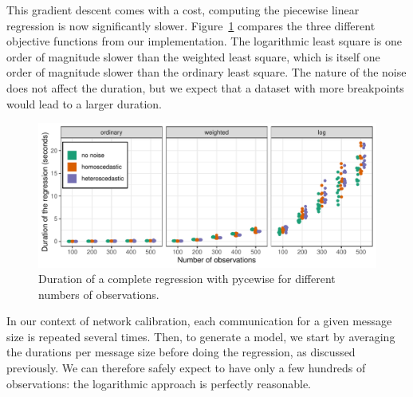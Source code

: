                 This gradient descent comes with a cost, computing the piecewise linear regression is now significantly
                slower. Figure~\ref{fig:prediction:pycewise_duration} compares the three different objective functions
                from our implementation. The logarithmic least square is one order of magnitude slower than the weighted
                least square, which is itself one order of magnitude slower than the ordinary least square. The nature
                of the noise does not affect the duration, but we expect that a dataset with more breakpoints would lead
                to a larger duration.
                \begin{figure}[htpb]
                    \centering
                    \includegraphics[width=\linewidth]{img/prediction/modeling/network/pycewise_duration.pdf}
                    \caption{Duration of a complete regression with pycewise for different numbers of observations.}%
                    \label{fig:prediction:pycewise_duration}
                \end{figure}

                In our context of network calibration, each communication for a given message size is repeated several
                times. Then, to generate a model, we start by averaging the durations per message size before doing the
                regression, as discussed previously. We can therefore safely expect to have only a few hundreds of
                observations: the logarithmic approach is perfectly reasonable.

